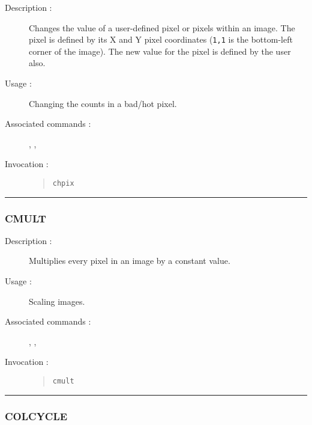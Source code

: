 \begin{description}

\item[Description :] Changes the value of a user-defined
pixel or pixels within an image.  The pixel is defined by its X and Y
pixel coordinates ({\tt 1,1} is the bottom-left corner of the image).
The new value for the pixel is defined by the user also.

\item[Usage :] Changing the counts in a bad/hot pixel.

\item[Associated commands :] {\tt {}}, 
{\tt {}}, {\tt {}}

\item[Invocation :]

\begin{quote}{\tt  chpix }\end{quote}

\end{description}

\hrule 
\subsubsection*{\label{CMULT}CMULT}

\begin{description}

\item[Description :] Multiplies every pixel in an image by a constant value.  

\item[Usage :] Scaling images.

\item[Associated commands :] {\tt {}}, 
{\tt {}}, {\tt {}}

\item[Invocation :]

\begin{quote}{\tt cmult }\end{quote}

\end{description}

\hrule 
\subsubsection*{\label{COLCYCLE}COLCYCLE}

